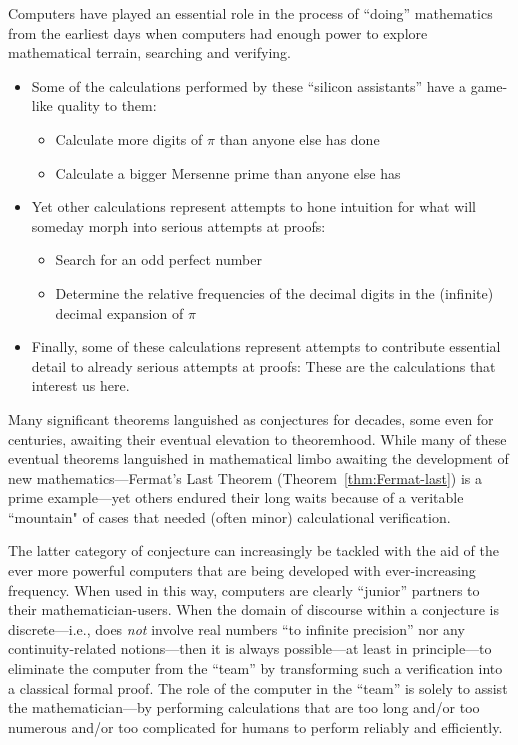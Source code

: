 Computers have played an essential role in the process of ``doing'' mathematics from the earliest days when computers had enough power to explore mathematical terrain, searching and verifying.
\begin{itemize}
\item
Some of the calculations performed by these ``silicon assistants'' have a game-like quality to them:
  \begin{itemize}
  \item
Calculate more digits of $\pi$ than anyone else has done
  \medskip\item
Calculate a bigger Mersenne prime than anyone else has
  \end{itemize}

\medskip\item
Yet other calculations represent attempts to hone intuition for what will someday morph into serious attempts at proofs:
  \begin{itemize}
  \item
Search for an odd perfect number
  \medskip\item
Determine the relative frequencies of the decimal digits in the (infinite) decimal expansion of $\pi$
  \end{itemize}

\medskip\item
Finally, some of these calculations represent attempts to contribute essential detail to already serious attempts at proofs: These are the calculations that interest us here.
\end{itemize}

Many significant theorems languished as conjectures for decades, some even for centuries, awaiting their eventual elevation to theoremhood.  While many of these eventual theorems languished in mathematical limbo awaiting the development of new mathematics---Fermat's Last Theorem (Theorem~\ref{thm:Fermat-last}) is a prime example---yet others endured their long waits because of a veritable ``mountain" of cases that needed (often minor) calculational verification.

\smallskip

The latter category of conjecture can increasingly be tackled with the aid of the ever more powerful computers that are being developed with ever-increasing frequency.  When used in this way, computers are clearly ``junior'' partners to their mathematician-users.  When the domain of discourse within a conjecture is discrete---i.e., does {\em not} involve real numbers ``to infinite precision'' nor any continuity-related notions---then it is always possible---at least in principle---to eliminate the computer from the ``team'' by transforming such a verification into a classical formal proof.  The role of the computer in the ``team'' is solely to assist the mathematician---by
performing calculations that are too long and/or too numerous and/or too complicated for humans to perform reliably and efficiently.

